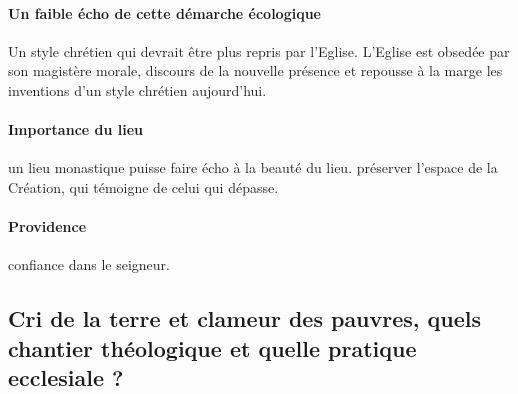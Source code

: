 \paragraph{Un faible écho de cette démarche écologique} Un style chrétien qui devrait être plus repris par l'Eglise. L'Eglise est obsedée par son magistère morale, discours de la nouvelle présence et repousse à la marge les inventions d'un style chrétien aujourd'hui. 

\paragraph{Importance du lieu} un lieu monastique puisse faire écho à la beauté du lieu. préserver l'espace de la Création, qui témoigne de celui qui dépasse.

\paragraph{Providence} confiance dans le seigneur. 

\subsection{Cri de la terre et clameur des pauvres, quels chantier théologique et quelle pratique ecclesiale ?}

